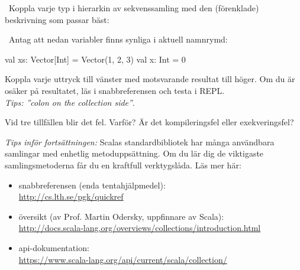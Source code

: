 \QUESTEND





\QUESTBEGIN

\Task \what~Koppla varje typ i hierarkin av sekvenssamling med den (förenklade) beskrivning som passar bäst:

\begin{ConceptConnections}

\end{ConceptConnections}

\SOLUTION

\TaskSolved \what

\begin{ConceptConnections}

\end{ConceptConnections}

\QUESTEND



\QUESTBEGIN

\Task \what~Antag att nedan variabler finns synliga i aktuell namnrymd:
\begin{Code}
val xs: Vector[Int] = Vector(1, 2, 3)
val x: Int = 0
\end{Code}

\Subtask Koppla varje uttryck till vänster med motsvarande resultat till höger. Om du är osäker på resultatet, läs i snabbreferensen och testa i REPL. \\\emph{Tips: ''colon on the collection side''}.

\begin{ConceptConnections}

\end{ConceptConnections}

\Subtask Vid tre tillfällen blir det fel. Varför? Är det kompileringsfel eller exekveringsfel?



\begin{framed}
\noindent\emph{Tips inför fortsättningen:}
Scalas standardbibliotek har många användbara samlingar med enhetlig metoduppsättning. Om du lär dig de viktigaste samlingsmetoderna får du en kraftfull verktygslåda. Läs mer här:

    \begin{itemize}%
      \item snabbreferensen (enda tentahjälpmedel): \\{\small\url{http://cs.lth.se/pgk/quickref}}
      \item översikt (av Prof. Martin Odersky, uppfinnare av Scala): \\
       {\small\url{http://docs.scala-lang.org/overviews/collections/introduction.html}}
      \item api-dokumentation:\\  {\small\url{https://www.scala-lang.org/api/current/scala/collection/}}
    \end{itemize}
\end{framed}



